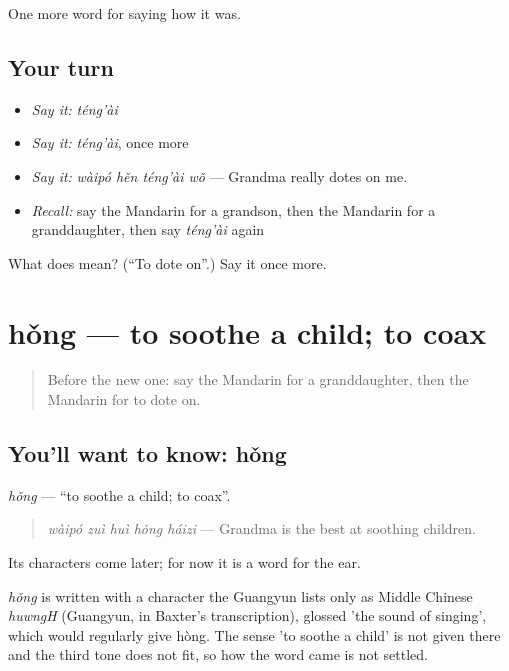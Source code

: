 \begin{grammarlens}[title={What you've built}]
One more word for saying how it was.
\end{grammarlens}

\subsection*{Your turn}
\begin{itemize}
\raggedright
  \item \emph{Say it:} \emph{téng'ài}
  \item \emph{Say it:} \emph{téng'ài}, once more
  \item \emph{Say it:} \emph{wàipó hěn téng'ài wǒ} — Grandma really dotes on me.
  \item \emph{Recall:} say the Mandarin for a grandson, then the Mandarin for a granddaughter, then say \emph{téng'ài} again
\end{itemize}

\begin{tcolorbox}[breakable,colback=teal!4,colframe=teal!35!black,title={Before you move on}]
What does  mean? (\textquotedblleft{}To dote on\textquotedblright{}.) Say it once more.
\end{tcolorbox}
\section[hǒng]{hǒng — to soothe a child; to coax}

\label{lesson:ZH-C510-hong}



\begin{quote}
Before the new one: say the Mandarin for a granddaughter, then the Mandarin for to dote on.
\end{quote}

\subsection*{You'll want to know: hǒng}
\emph{hǒng} — \textquotedblleft{}to soothe a child; to coax\textquotedblright{}.

\begin{quote}
\emph{wàipó zuì huì hǒng háizi} — Grandma is the best at soothing children.
\end{quote}

Its characters come later; for now it is a word for the ear.

\begin{cousinweb}
\emph{hǒng} is written with a character the Guangyun lists only as Middle Chinese \emph{huwngH} (Guangyun, in Baxter's transcription), glossed 'the sound of singing', which would regularly give hòng. The sense 'to soothe a child' is not given there and the third tone does not fit, so how the word came is not settled.
\end{cousinweb}

